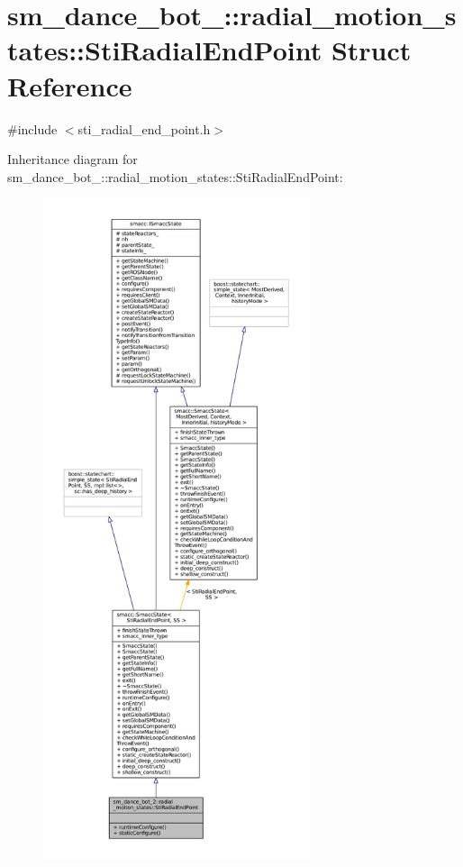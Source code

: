 \hypertarget{structsm__dance__bot__2_1_1radial__motion__states_1_1StiRadialEndPoint}{}\section{sm\+\_\+dance\+\_\+bot\+\_\+:\+:radial\+\_\+motion\+\_\+states\+:\+:Sti\+Radial\+End\+Point Struct Reference}
\label{structsm__dance__bot__2_1_1radial__motion__states_1_1StiRadialEndPoint}


{\ttfamily \#include $<$sti\+\_\+radial\+\_\+end\+\_\+point.\+h$>$}



Inheritance diagram for sm\+\_\+dance\+\_\+bot\+\_\+:\+:radial\+\_\+motion\+\_\+states\+:\+:Sti\+Radial\+End\+Point\+:
\nopagebreak
\begin{figure}[H]
\begin{center}
\leavevmode
\includegraphics[height=550pt]{structsm__dance__bot__2_1_1radial__motion__states_1_1StiRadialEndPoint__inherit__graph}
\end{center}
\end{figure}



